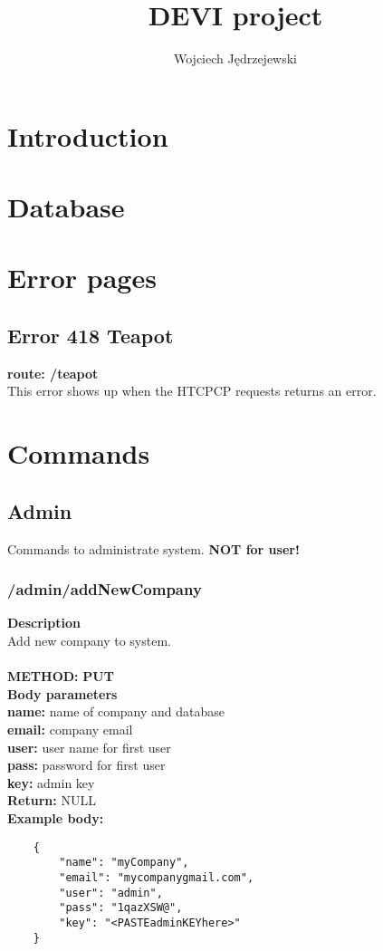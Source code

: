 \documentclass[a4paper, 12pt]{report}
\begin{document}
\title{\Large{\textbf{DEVI project}}}
\author{Wojciech Jędrzejewski}

\maketitle

\chapter{Introduction}

\chapter{Database}

\chapter{Error pages}
\section{Error 418 Teapot}
\textbf{route: \color{redText} /teapot} \\
This error shows up when the HTCPCP requests returns an error.

\chapter{Commands}
\section{Admin}
Commands to administrate system. \textbf{NOT for user!}

\subsection{/admin/addNewCompany}


\textbf{\color{redText} Description} \\
Add new company to system. \\ \\
\textbf{\color{redText} METHOD: } \textbf{PUT} \\
\textbf{\color{redText} Body parameters} \\
\textbf{name: } name of company and database \\
\textbf{email: } company email \\
\textbf{user: } user name for first user \\
\textbf{pass: } password for first user \\
\textbf{key: } admin key \\
\textbf{\color{redText} Return: } NULL \\
\textbf{\color{redText} Example body: }
\begin{lstlisting}
    {
        "name": "myCompany",
        "email": "mycompanygmail.com",
        "user": "admin",
        "pass": "1qazXSW@",
        "key": "<PASTEadminKEYhere>"
    }
\end{lstlisting}
\end{document}
